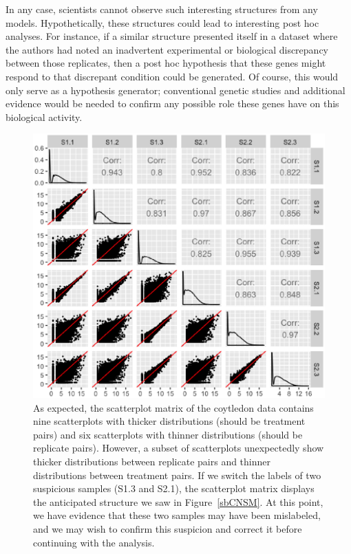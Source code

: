 \documentclass{bioinfo}
\begin{document}
In any case, scientists cannot observe such interesting structures from any models. Hypothetically, these structures could lead to interesting post hoc analyses. For instance, if a similar structure presented itself in a dataset where the authors had noted an inadvertent experimental or biological discrepancy between those replicates, then a post hoc hypothesis that these genes might respond to that discrepant condition could be generated. Of course, this would only serve as a hypothesis generator; conventional genetic studies and additional evidence would be needed to confirm any possible role these genes have on this biological activity.

\begin{figure}
\includegraphics[width=\linewidth]{sbCNSwitchedSM.eps}
\caption{As expected, the scatterplot matrix of the coytledon data \citep{Brown} contains nine scatterplots with thicker distributions (should be treatment pairs) and six scatterplots with thinner distributions (should be replicate pairs). However, a subset of scatterplots unexpectedly show thicker distributions between replicate pairs and thinner distributions between treatment pairs. If we switch the labels of two suspicious samples (S1.3 and S2.1), the scatterplot matrix displays the anticipated structure we saw in Figure~\ref{sbCNSM}. At this point, we have evidence that these two samples may have been mislabeled, and we may wish to confirm this suspicion and correct it before continuing with the analysis.
\label{sbCNSwitchedSM}}
\end{figure}
\end{document}
